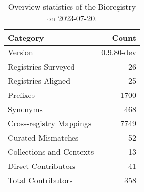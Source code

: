 \begin{table}
\caption{Overview statistics of the Bioregistry on 2023-07-20.}
\label{tab:bioregistry-summary}
\begin{tabular}{lr}
\toprule
Category & Count \\
\midrule
Version & 0.9.80-dev \\
Registries Surveyed & 26 \\
Registries Aligned & 25 \\
Prefixes & 1700 \\
Synonyms & 468 \\
Cross-registry Mappings & 7749 \\
Curated Mismatches & 52 \\
Collections and Contexts & 13 \\
Direct Contributors & 41 \\
Total Contributors & 358 \\
\bottomrule
\end{tabular}
\end{table}

